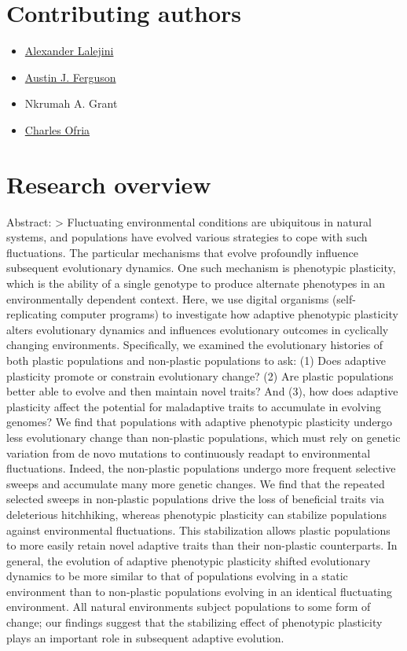 \documentclass[]{book}
\providecommand{\tightlist}{%
  \setlength{\itemsep}{0pt}\setlength{\parskip}{0pt}}
\begin{document}
\hypertarget{contributing-authors}{%
\section{Contributing authors}\label{contributing-authors}}

\begin{itemize}
\tightlist
\item
  \href{https://lalejini.com/}{Alexander Lalejini}
\item
  \href{http://austinjferguson.com/}{Austin J. Ferguson}
\item
  Nkrumah A. Grant
\item
  \href{https://ofria.com/}{Charles Ofria}
\end{itemize}

\hypertarget{research-overview}{%
\section{Research overview}\label{research-overview}}

Abstract:
\textgreater{} Fluctuating environmental conditions are ubiquitous in natural systems, and populations have evolved various strategies to cope with such fluctuations.
The particular mechanisms that evolve profoundly influence subsequent evolutionary dynamics.
One such mechanism is phenotypic plasticity, which is the ability of a single genotype to produce alternate phenotypes in an environmentally dependent context.
Here, we use digital organisms (self-replicating computer programs) to investigate how adaptive phenotypic plasticity alters evolutionary dynamics and influences evolutionary outcomes in cyclically changing environments.
Specifically, we examined the evolutionary histories of both plastic populations and non-plastic populations to ask:
(1) Does adaptive plasticity promote or constrain evolutionary change?
(2) Are plastic populations better able to evolve and then maintain novel traits?
And (3), how does adaptive plasticity affect the potential for maladaptive traits to accumulate in evolving genomes?
We find that populations with adaptive phenotypic plasticity undergo less evolutionary change than non-plastic populations, which must rely on genetic variation from de novo mutations to continuously readapt to environmental fluctuations.
Indeed, the non-plastic populations undergo more frequent selective sweeps and accumulate many more genetic changes.
We find that the repeated selected sweeps in non-plastic populations drive the loss of beneficial traits via deleterious hitchhiking, whereas phenotypic plasticity can stabilize populations against environmental fluctuations.
This stabilization allows plastic populations to more easily retain novel adaptive traits than their non-plastic counterparts.
In general, the evolution of adaptive phenotypic plasticity shifted evolutionary dynamics to be more similar to that of populations evolving in a static environment than to non-plastic populations evolving in an identical fluctuating environment.
All natural environments subject populations to some form of change; our findings suggest that the stabilizing effect of phenotypic plasticity plays an important role in subsequent adaptive evolution.
\end{document}
